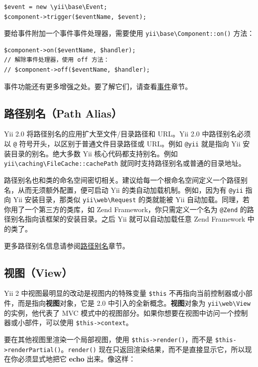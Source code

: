 \lstset{language=php}\begin{lstlisting}
$event = new \yii\base\Event;
$component->trigger($eventName, $event);
\end{lstlisting}
要给事件附加一个事件事件处理器，需要使用 \texttt{yii{\allowbreak{}\textbackslash}base{\allowbreak{}\textbackslash}Component\allowbreak{}::\allowbreak{}on()} 方法：

\lstset{language=php}\begin{lstlisting}
$component->on($eventName, $handler);
// 解除事件处理器，使用 off 方法：
// $component->off($eventName, $handler);
\end{lstlisting}
事件功能还有更多增强之处。要了解它们，请查看\hyperref[concept-events.md]{事件}章节。

\subsection{路径别名（Path Alias）}
Yii 2.0 将路径别名的应用扩大至文件/目录路径和 URL。Yii 2.0 中路径别名必须以 \lstinline|@| 符号开头，以区别于普通文件目录路径或 URL。例如 \lstinline|@yii| 就是指向 Yii 安装目录的别名。绝大多数 Yii 核心代码都支持别名。例如 \texttt{yii{\allowbreak{}\textbackslash}caching{\allowbreak{}\textbackslash}FileCache\allowbreak{}::\allowbreak{}cachePath} 就同时支持路径别名或普通的目录地址。

路径别名也和类的命名空间密切相关。建议给每一个根命名空间定义一个路径别名，从而无须额外配置，便可启动 Yii 的类自动加载机制。例如，因为有 \lstinline|@yii| 指向 Yii 安装目录，那类似 \lstinline|yii\web\Request| 的类就能被 Yii 自动加载。同理，若你用了一个第三方的类库，如 Zend Framework，你只需定义一个名为 \lstinline|@Zend| 的路径别名指向该框架的安装目录。之后 Yii 就可以自动加载任意 Zend Framework 中的类了。

更多路径别名信息请参阅\hyperref[concept-aliases.md]{路径别名}章节。

\subsection{视图（View）}
Yii 2 中视图最明显的改动是视图内的特殊变量 \lstinline|$this| 不再指向当前控制器或小部件，而是指向\textbf{视图}对象，它是 2.0 中引入的全新概念。\textbf{视图}对象为 \texttt{yii{\allowbreak{}\textbackslash}web{\allowbreak{}\textbackslash}View} 的实例，他代表了 MVC 模式中的视图部分。如果你想要在视图中访问一个控制器或小部件，可以使用 \lstinline|$this->context|。

要在其他视图里渲染一个局部视图，使用 \lstinline|$this->render()|，而不是 \lstinline|$this->renderPartial()|。\lstinline|render()| 现在只返回渲染结果，而不是直接显示它，所以现在你必须显式地把它 \textbf{echo} 出来。像这样：

